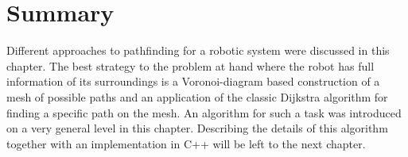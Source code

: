 \section{Summary}
Different approaches to pathfinding for a robotic system were discussed in this chapter.
The best strategy to the problem at hand where the robot has full information of its
surroundings is a Voronoi-diagram based construction of a mesh of possible paths and 
an application of the classic Dijkstra algorithm for finding a specific path on the mesh.
An algorithm for such a task was introduced on a very general level in this chapter.
Describing the details of this algorithm together with an implementation in C++  
will be left to the next chapter.
